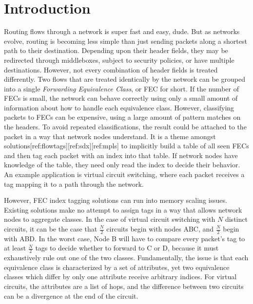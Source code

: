 \section{Introduction}


Routing flows through a network is super fast and easy, dude. But as networks evolve, routing is becoming less simple than just sending packets along a shortest path to their destination. Depending upon their header fields, they may be redirected through middleboxes, subject to security policies, or have multiple destinations. However, not every combination of header fields is treated differently. Two flows that are treated identically by the network can be grouped into a single \textit{Forwarding Equivalence Class}, or FEC for short. If the number of FECs is small, the network can behave correctly using only a small amount of information about how to handle each equivalence class. However, classifying packets to FECs can be expensive, using a large amount of pattern matches on the headers. To avoid repeated classifications, the result could be attached to the packet in a way that network nodes understand. It is a theme amongst solutions[ref:flowtags][ref:sdx][ref:mpls] to implicitly build a table of all seen FECs and then tag each packet with an index into that table. If network nodes have knowledge of the table, they need only read the index to decide their behavior. An example application is virtual circuit switching, where each packet receives a tag mapping it to a path through the network. 


However, FEC index tagging solutions can run into memory scaling issues. 
Existing solutions make no attempt to assign tags in a way that allows network nodes to aggregate classes. In the case of virtual circuit switching with $N$ distinct circuits, it can be the case that $\frac{N}{2}$ circuits begin with nodes ABC, and $\frac{N}{2}$ begin with ABD. In the worst case, Node B will have to compare every packet's tag to at least $\frac{N}{2}$ tags to decide whether to forward to C or D, because it must exhaustively rule out one of the two classes. Fundamentally, the issue is that each equivalence class is characterized by a set of attributes, yet two equivalence classes which differ by only one attribute receive arbitrary indices. For virtual circuits, the attributes are a list of hops, and the difference between two circuits can be a divergence at the end of the circuit.



